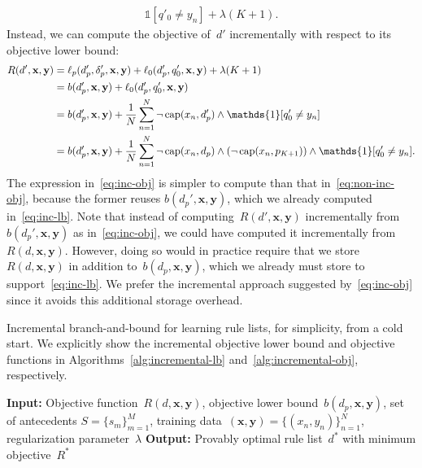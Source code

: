 \documentclass[twoside,11pt]{article}
\def\one{\mathds{1}}
\newcommand{\x}{\mathbf{x}}
\newcommand{\y}{\mathbf{y}}
\def\RL{{d}}
\def\Prefix{d_p}
\def\Labels{\delta_p}
\def\Default{q_0}
\def\Obj{R}
\def\Loss{\ell}
\def\Reg{{\lambda}}
\def\RuleSet{S}
\def\Cap{\textnormal{cap}}
\def\OptimalObj{R^*}
\def\OptimalRL{d^*}
\def\one{\mathds{1}}
\newcommand{\nn}{\nonumber}
\begin{document}
\begin{arxiv}
\begin{align}
  \one [q'_0 \neq y_n] + \Reg (K+1). \label{eq:non-inc-obj}
\end{align}
Instead, we can compute the objective of~$\RL'$ incrementally
with respect to its objective lower bound:
\begin{align}
\Obj(\RL', \x, \y) &=  \Loss_p(\Prefix', \Labels', \x, \y) +
  \Loss_0(\Prefix', \Default', \x, \y) + \Reg (K + 1) \nn \\
&= b(\Prefix', \x, \y) + \Loss_0(\Prefix', \Default', \x, \y) \nn \\
&= b(\Prefix', \x, \y) + \frac{1}{N}\sum_{n=1}^N \neg\, \Cap(x_n, \Prefix') \wedge
  \one [q'_0 \neq y_n] \nn \\
&= b(\Prefix', \x, \y) + \frac{1}{N}\sum_{n=1}^N \neg\, \Cap(x_n, \Prefix) \wedge
  (\neg\, \Cap(x_n, p_{K+1})) \wedge \one [q'_0 \neq y_n].
\label{eq:inc-obj}
\end{align}
The expression in~\eqref{eq:inc-obj} is simpler to compute than that
in~\eqref{eq:non-inc-obj}, because the former reuses $b(\Prefix', \x, \y)$,
which we already computed in~\eqref{eq:inc-lb}.
%
Note that instead of computing~$\Obj(\RL', \x, \y)$ incrementally from $b(\Prefix', \x, \y)$
as in~\eqref{eq:inc-obj}, we could have computed it incrementally from $\Obj(\RL, \x, \y)$.
However, doing so would in practice require that we store~$\Obj(\RL, \x, \y)$
in addition to~$b(\Prefix, \x, \y)$, which we already must store to support~\eqref{eq:inc-lb}.
We prefer the incremental approach suggested by~\eqref{eq:inc-obj}
since it avoids this additional storage overhead.

\begin{algorithm}[t!]
  \caption{Incremental branch-and-bound for learning rule lists, for simplicity, from a cold start.
  We explicitly show the incremental objective lower bound and objective functions in Algorithms~\ref{alg:incremental-lb} and~\ref{alg:incremental-obj}, respectively.}
\label{alg:incremental}
\begin{algorithmic}
\normalsize
\State \textbf{Input:} Objective function~$\Obj(\RL, \x, \y)$,
objective lower bound~${b(\Prefix, \x, \y)}$,
set of antecedents ${\RuleSet = \{s_m\}_{m=1}^M}$,
training data~$(\x, \y) = {\{(x_n, y_n)\}_{n=1}^N}$,
regularization parameter~$\Reg$
\State \textbf{Output:} Provably optimal rule list~$\OptimalRL$ with minimum objective~$\OptimalObj$ \\


\end{algorithmic}
\end{algorithm}
\end{arxiv}
\end{document}
